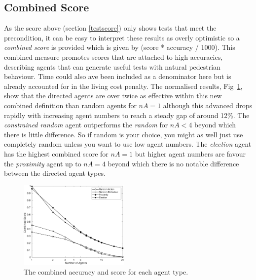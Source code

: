 \documentclass[letterpaper, 10 pt, journal, twoside]{IEEEtran}
\begin{document}
\subsection{Combined Score}
As the score above (section \ref{testscore}) only shows tests that meet the precondition, it can be easy to interpret these results as overly optimistic so a \textit{combined score} is provided which is given by (score * accuracy / 1000). This combined measure promotes scores that are attached to high accuracies, describing agents that can generate useful tests with natural pedestrian behaviour. Time could also ave been included as a denominator here but is already accounted for in the living cost penalty. %
%
The normalised results, Fig~\ref{Combined}, show that the directed agents are over twice as effective within this new combined definition than random agents for $nA=1$ although this advanced drops rapidly with increasing agent numbers to reach a steady gap of around 12\%.
%
The \textit{constrained random} agent outperforms the \textit{random} for $nA<4$ beyond which there is little difference. So if random is your choice, you might as well just use completely random unless you want to use low agent numbers. %
%
The \textit{election} agent has the highest combined score for $nA=1$ but higher agent numbers are favour the \textit{proximity} agent up to $nA=4$ beyond which there is no notable difference between the directed agent types. %
%

\begin{figure}[!t]
	\centering
\includegraphics[width=0.48\textwidth]{Combined.pdf}
	\caption{The combined accuracy and score for each agent type.}
	\label{Combined}
\end{figure}

\end{document}
